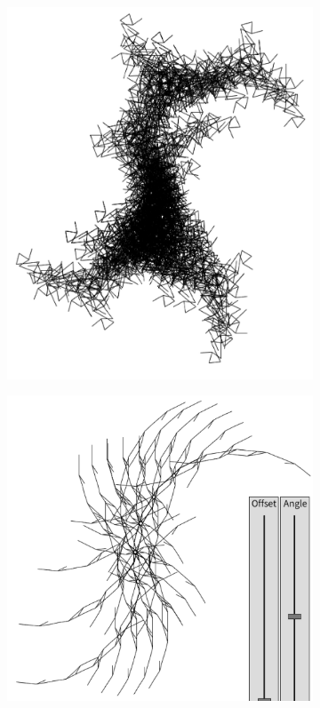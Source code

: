 \documentclass[12pt,twoside]{reedthesis}
\begin{document}
\begin{figure}[H]
	\begin{subfigure}{0.47\linewidth}
		\centering
		\includegraphics[width=\linewidth]{Images/Living}
	\end{subfigure}
	\hfill
	\begin{subfigure}{0.47\linewidth}
		\centering
		\includegraphics[width=\linewidth]{Images/Stars}
	\end{subfigure}
	\end{figure}
      
\end{document}
